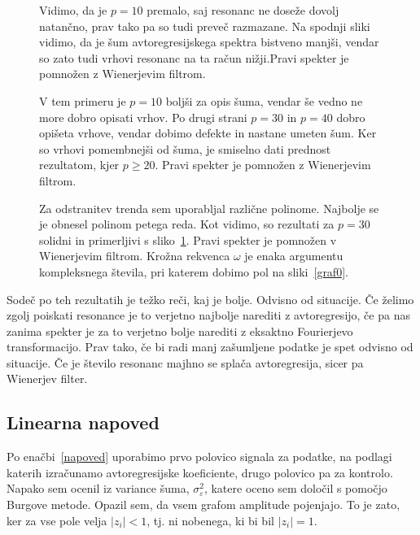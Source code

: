 \documentclass[a4 paper, 12pt]{article}
\newcommand{\e}{
	\ensuremath{\varepsilon}
}
\newcommand{\w}{
	\ensuremath{\omega}
}
\begin{document}
\begin{figure}[H]\centering
	
	\caption{Vidimo, da je $p = 10$ premalo, saj resonanc ne dose\v ze dovolj natan\v cno, prav tako pa so tudi
		preve\v c razmazane. Na spodnji sliki vidimo, da je \v sum avtoregresijskega spektra bistveno manj\v si,
		vendar so zato tudi vrhovi resonanc na ta ra\v cun ni\v zji.Pravi spekter je pomno\v zen z Wienerjevim
		filtrom.}
	\label{gr1}
\end{figure}

\begin{figure}[H]\centering
	
	\caption{V tem primeru je $p = 10$ bolj\v si za opis \v suma, vendar \v se vedno ne more dobro opisati
		vrhov. Po drugi strani $p = 30$ in $p = 40$ dobro opi\v seta vrhove, vendar dobimo defekte in
		nastane umeten \v sum. Ker so vrhovi pomembnej\v si od \v suma, je smiselno dati prednost rezultatom,
		kjer $p \geq 20$. Pravi spekter je pomno\v zen z Wienerjevim filtrom.}
	\label{gr2}
\end{figure}

\begin{figure}[H]\centering
	
	\caption{Za odstranitev trenda sem uporabljal razli\v cne polinome. Najbolje se je obnesel polinom petega
		reda. Kot vidimo, so rezultati za $p = 30$ solidni in primerljivi s sliko~\ref{gr1}. Pravi spekter je
		pomno\v zen v Wienerjevim filtrom. Kro\v zna rekvenca $\w$ je enaka argumentu kompleksnega
		\v stevila, pri katerem dobimo pol na sliki~\ref{graf0}.}
	\label{gr3}
\end{figure}

Sode\v c po teh rezultatih je te\v zko re\v ci, kaj je bolje. Odvisno od situacije. \v Ce \v zelimo zgolj poiskati
resonance je to verjetno najbolje narediti z avtoregresijo, \v ce pa nas zanima spekter je za to verjetno bolje
narediti z eksaktno Fourierjevo transformacijo. Prav tako, \v ce bi radi manj za\v sumljene podatke je spet
odvisno od situacije. \v Ce je \v stevilo resonanc majhno se spla\v ca avtoregresija, sicer pa Wienerjev filter.

\subsection{Linearna napoved}

Po ena\v cbi~\eqref{napoved} uporabimo prvo polovico signala za podatke, na podlagi katerih izra\v cunamo avtoregresijske
koeficiente, drugo polovico pa za kontrolo. Napako sem ocenil iz variance \v suma, $\sigma_\e^2$, katere oceno sem
dolo\v cil s pomo\v cjo Burgove metode. Opazil sem, da vsem grafom amplitude pojenjajo. To je zato, ker za vse pole
velja $|z_i| < 1$, tj. ni nobenega, ki bi bil $|z_i| = 1$.
\end{document}
